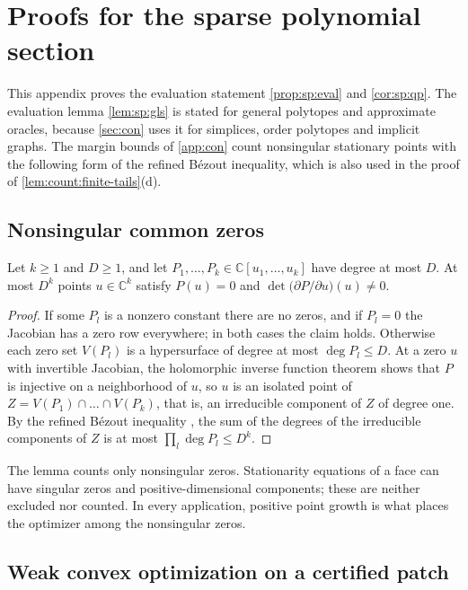 \section{Proofs for the sparse polynomial section}\label{app:sp}

This appendix proves the evaluation statement \cref{prop:sp:eval} and
\cref{cor:sp:qp}. The evaluation lemma \cref{lem:sp:gls} is stated for
general polytopes and approximate oracles, because \cref{sec:con} uses it for
simplices, order polytopes and implicit graphs. The margin bounds of
\cref{app:con} count nonsingular stationary points with the following form of
the refined B\'ezout inequality, which is also used in the proof of
\cref{lem:count:finite-tails}(d).

\subsection{Nonsingular common zeros}\label{app:sp:bezout}

\begin{lemma}\label{lem:sp:bezout}
Let $k\ge1$ and $D\ge1$, and let $P_1,\dots,P_k\in\mathbb C[u_1,\dots,u_k]$
have degree at most $D$. At most $D^k$ points $u\in\mathbb C^k$ satisfy
$P(u)=0$ and $\det\bigl(\partial P/\partial u\bigr)(u)\ne0$.
\end{lemma}

\begin{proof}
If some $P_l$ is a nonzero constant there are no zeros, and if $P_l=0$ the
Jacobian has a zero row everywhere; in both cases the claim holds. Otherwise
each zero set $V(P_l)$ is a hypersurface of degree at most $\deg P_l\le D$.
At a zero $u$ with invertible Jacobian, the holomorphic inverse function
theorem shows that $P$ is injective on a neighborhood of $u$, so $u$ is an
isolated point of $Z=V(P_1)\cap\dots\cap V(P_k)$, that is, an irreducible
component of $Z$ of degree one. By the refined B\'ezout inequality
\citep[Example~8.4.6]{fulton1998-intersection-theory}, the sum of the degrees
of the irreducible components of $Z$ is at most $\prod_l\deg P_l\le D^k$.
\end{proof}

The lemma counts only nonsingular zeros. Stationarity equations of a face
can have singular zeros and positive-dimensional components; these are
neither excluded nor counted. In every application, positive point growth is
what places the optimizer among the nonsingular zeros.

\subsection{Weak convex optimization on a certified patch}\label{app:sp:eval}

